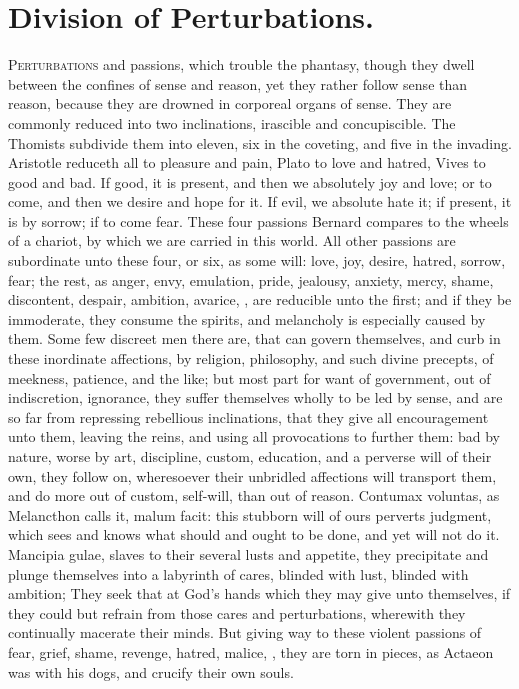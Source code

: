 {%
\section{Division of Perturbations.}

\lettrine{P}{erturbations} and passions, which trouble the phantasy, though they
dwell between the confines of sense and reason, yet they rather follow
sense than reason, because they are drowned in corporeal organs of
sense. They are commonly reduced into two inclinations, irascible
and concupiscible. The Thomists subdivide them into eleven, six in the
coveting, and five in the invading. Aristotle reduceth all to pleasure
and pain, Plato to love and hatred, Vives to good and bad. If
good, it is present, and then we absolutely joy and love; or to come,
and then we desire and hope for it. If evil, we absolute hate it; if
present, it is by sorrow; if to come fear. These four passions
Bernard compares to the wheels of a chariot, by which we are
carried in this world. All other passions are subordinate unto these
four, or six, as some will: love, joy, desire, hatred, sorrow, fear;
the rest, as anger, envy, emulation, pride, jealousy, anxiety, mercy,
shame, discontent, despair, ambition, avarice, \etc{}, are reducible unto
the first; and if they be immoderate, they consume the spirits,
and melancholy is especially caused by them. Some few discreet men
there are, that can govern themselves, and curb in these inordinate
affections, by religion, philosophy, and such divine precepts, of
meekness, patience, and the like; but most part for want of government,
out of indiscretion, ignorance, they suffer themselves wholly to be led
by sense, and are so far from repressing rebellious inclinations, that
they give all encouragement unto them, leaving the reins, and using all
provocations to further them: bad by nature, worse by art, discipline,
custom, education, and a perverse will of their own, they follow
on, wheresoever their unbridled affections will transport them, and do
more out of custom, self-will, than out of reason. Contumax voluntas,
as Melancthon calls it, malum facit: this stubborn will of ours
perverts judgment, which sees and knows what should and ought to be
done, and yet will not do it. Mancipia gulae, slaves to their several
lusts and appetite, they precipitate and plunge themselves into a
labyrinth of cares, blinded with lust, blinded with ambition;
They seek that at God's hands which they may give unto
themselves, if they could but refrain from those cares and
perturbations, wherewith they continually macerate their minds. But
giving way to these violent passions of fear, grief, shame, revenge,
hatred, malice, \etc{}, they are torn in pieces, as Actaeon was with his
dogs, and crucify their own souls.

}
